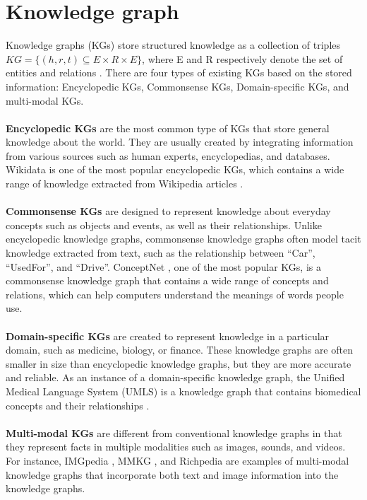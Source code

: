 \section {Knowledge graph}
Knowledge graphs (KGs) store structured knowledge as a collection of triples $KG = \{(h, r, t) \subseteq E \times R \times E\}$, where E and R respectively denote the set of entities and relations \cite{9416312}. There are four types of existing KGs based on the stored information: Encyclopedic KGs, Commonsense KGs, Domain-specific KGs, and multi-modal KGs.\\\\
\textbf{Encyclopedic KGs}  are the most common type of KGs that store general knowledge about the world. They are usually created by integrating information from various sources such as human experts, encyclopedias, and databases. Wikidata is one of the most popular encyclopedic KGs, which contains a wide range of knowledge extracted from Wikipedia articles \cite{10.1145/2629489}.\\\\
\textbf{Commonsense KGs} are designed to represent knowledge about everyday concepts such as objects and events, as well as their relationships. Unlike encyclopedic knowledge graphs, commonsense knowledge graphs often model tacit knowledge extracted from text, such as the relationship between “Car”, “UsedFor”, and “Drive”. ConceptNet \cite{speer2017conceptnet}, one of the most popular KGs, is a commonsense knowledge graph that contains a wide range of concepts and relations, which can help computers understand the meanings of words people use. \\\\
\textbf{Domain-specific KGs} are created to represent knowledge in a particular domain, such as medicine, biology, or finance. These knowledge graphs are often smaller in size than encyclopedic knowledge graphs, but they are more accurate and reliable. As an instance of a domain-specific knowledge graph, the Unified Medical Language System (UMLS) is a knowledge graph that contains biomedical concepts and their relationships \cite{Bodenreider2004TheUM}.\\\\
\textbf{Multi-modal KGs} are different from conventional knowledge graphs in that they represent facts in multiple modalities such as images, sounds, and videos. For instance, IMGpedia \cite{10.1007/978-3-319-68204-4_8}, MMKG \cite{liu2019mmkg}, and Richpedia \cite{wang2020richpedia} are examples of multi-modal knowledge graphs that incorporate both text and image information into the knowledge graphs. 